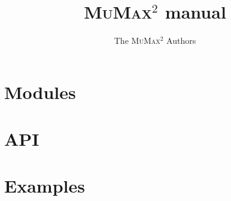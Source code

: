 \documentclass[a4paper, twoside]{article}
\newcommand{\mumax}{\textsc{MuMax}$^2$\xspace}
\newcommand{\doctitle}{\mumax manual}
\begin{document}
\hypersetup{breaklinks=true}
\setlength{\parindent}{0cm}

\title{\doctitle}
\author{The \mumax Authors}
\maketitle


\tableofcontents

\section{Modules}


\section{API}


\section{Examples}


\appendix
%
%
\printindex
\end{document}
